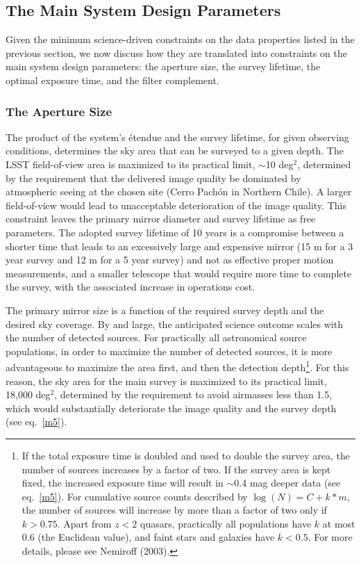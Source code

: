 \subsection{The Main System Design Parameters}

Given the minimum science-driven constraints on the data properties listed
in the previous section, we now discuss how they are translated into
constraints on the main system design parameters: the aperture size,
the survey lifetime, the optimal exposure time, and the filter complement.


\subsubsection{ The Aperture Size }
\label{Sec:apSize}
The product of the system's \'etendue and the survey lifetime, for given
observing conditions, determines
the sky area that can be surveyed to a given depth.
The
LSST field-of-view area is maximized to its practical limit, $\sim$10 deg$^2$,
determined by the requirement that the delivered image quality be dominated
by atmospheric seeing at the chosen site (Cerro Pach\'{o}n in Northern Chile).
A larger field-of-view would lead to unacceptable deterioration of the
image quality. This constraint leaves the primary mirror diameter and survey lifetime
as free parameters. The adopted survey lifetime of 10 years is a compromise
between a shorter time that leads to an excessively large and expensive mirror (15 m for a
3 year survey and 12 m for a 5 year survey) and not as effective proper motion
measurements, and a smaller telescope that would require more time to complete the
survey, with the associated increase in operations cost.

The primary mirror size is a function of the required survey depth and the
desired sky coverage. By and large, the anticipated science outcome scales
with the number of detected sources. For practically all astronomical source
populations, in order to maximize the number of detected sources, it is more
advantageous to maximize the area first, and then
the detection depth\footnote{
If the total exposure time is doubled and used to double the survey area,
the number of sources increases by a factor of two. If the survey
area is kept fixed, the increased exposure time will result in
$\sim$0.4 mag deeper data (see eq.~\ref{m5}). For cumulative source
counts described by $\log(N) = C + k*m$, the number of sources
will increase by more than a factor of two only if $k>0.75$.
Apart from $z<2$ quasars, practically all populations
have $k$ at most 0.6 (the Euclidean value), and faint stars
and galaxies have $k<0.5$. For more details, please see Nemiroff
(2003).}. For this reason, the sky area for the main survey is
maximized to its practical limit, 18,000 deg$^2$, determined by the
requirement to avoid airmasses less than 1.5,
which would substantially
deteriorate the image quality and the survey depth (see eq.~\ref{m5}).

